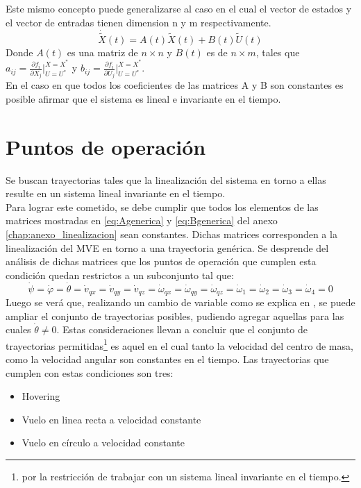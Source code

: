 \documentclass[main]{subfiles}
\begin{document}
Este mismo concepto puede generalizarse al caso en el cual el vector de estados y el vector de entradas tienen dimension n y m respectivamente.
\begin{equation}
\dot{\tilde{X}}(t)=A(t)\tilde{X}(t)+B(t)\tilde{U}(t)
\end{equation}
Donde $A(t)$ es una matriz de $n \times n$ y $B(t)$ es de $n \times m$, tales que $a_{ij}= \frac{\partial f_i}{\partial X_j}\vert_{U=U^*}^{X=X^*}$ y  $b_{ij}= \frac{\partial f_i}{\partial U_j}\vert_{U=U^*}^{X=X^*}$.\\

En el caso en que todos los coeficientes de las matrices A y B son constantes es posible afirmar que el sistema es lineal e invariante en el tiempo. 

\section{Puntos de operaci\'on}
Se buscan trayectorias tales que la linealizaci\'on del sistema en torno a ellas resulte en un sistema lineal invariante en el tiempo.\\

Para lograr este cometido, se debe cumplir que todos los elementos de las matrices mostradas en \ref{eq:Agenerica} y \ref{eq:Bgenerica} del anexo \ref{chap:anexo_linealizacion} sean constantes. Dichas matrices corresponden a la linealizaci\'on del MVE en torno a una trayectoria gen\'erica. Se desprende del an\'alisis de dichas matrices que los puntos de operaci\'on que cumplen esta condici\'on quedan restrictos a un subconjunto tal que:
\begin{equation}
\dot{\psi}=\dot{\varphi}=\dot{\theta}=\dot{v}_{qx}=\dot{v}_{qy}=\dot{v}_{qz}=\dot{\omega}_{qx}=\dot{\omega}_{qy}=\dot{\omega}_{qz}=\dot{\omega}_1=\dot{\omega}_2=\dot{\omega}_3=\dot{\omega}_4=0
\end{equation}
Luego se ver\'a que, realizando un cambio de variable como se explica en \cite{bib:auion}, se puede ampliar el conjunto de trayectorias posibles, pudiendo agregar aquellas para las cuales $\dot{\theta} \neq 0$. Estas consideraciones llevan a concluir que el conjunto de trayectorias permitidas\footnote{por la restricci\'on de trabajar con un sistema lineal invariante en el tiempo.} es aquel en el cual tanto la velocidad del centro de masa, como la velocidad angular son constantes en el tiempo. Las trayectorias que cumplen con estas condiciones son tres:

\begin{itemize}
\item Hovering
\item Vuelo en linea recta a velocidad constante
\item Vuelo en c\'irculo a velocidad constante 
\end{itemize} 
\end{document}
